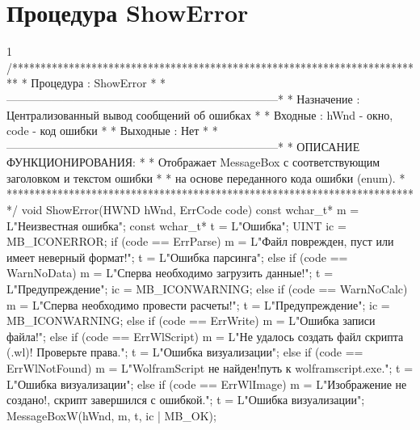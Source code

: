 \pagebreak

\section{Процедура ShowError}
\footnotesize
\begin{listing}{1}
/*************************************************************************
* Процедура     : ShowError                                              *
*------------------------------------------------------------------------*
* Назначение    : Централизованный вывод сообщений об ошибках            *
* Входные       : hWnd - окно, code - код ошибки                         *
* Выходные      : Нет                                                    *
*------------------------------------------------------------------------*
* ОПИСАНИЕ ФУНКЦИОНИРОВАНИЯ:                                             *
* Отображает MessageBox с соответствующим заголовком и текстом ошибки    *
* на основе переданного кода ошибки (enum).                              *
*************************************************************************/
void ShowError(HWND hWnd, ErrCode code) {
    const wchar_t* m = L"Неизвестная ошибка"; const wchar_t* t = L"Ошибка";
	UINT ic = MB_ICONERROR;
    if (code == ErrParse) { m = L"Файл поврежден, пуст или имеет неверный формат!"; 
        t = L"Ошибка парсинга"; }
    else if (code == WarnNoData) { m = L"Сперва необходимо загрузить данные!"; 
        t = L"Предупреждение"; ic = MB_ICONWARNING; }
    else if (code == WarnNoCalc) { m = L"Сперва необходимо провести расчеты!"; 
        t = L"Предупреждение"; ic = MB_ICONWARNING; }
    else if (code == ErrWrite) { m = L"Ошибка записи файла!"; }
    else if (code == ErrWlScript) { 
       m = L"Не удалось создать файл скрипта (.wl)! Проверьте права."; 
        t = L"Ошибка визуализации"; }
    else if (code == ErrWlNotFound) { 
       m = L"WolframScript не найден! путь к wolframscript.exe."; 
        t = L"Ошибка визуализации"; }
    else if (code == ErrWlImage) { 
       m = L"Изображение не создано!, скрипт завершился с ошибкой."; 
        t = L"Ошибка визуализации"; }
MessageBoxW(hWnd, m, t, ic | MB_OK);
}
\end{listing}
\normalsize
\pagebreak